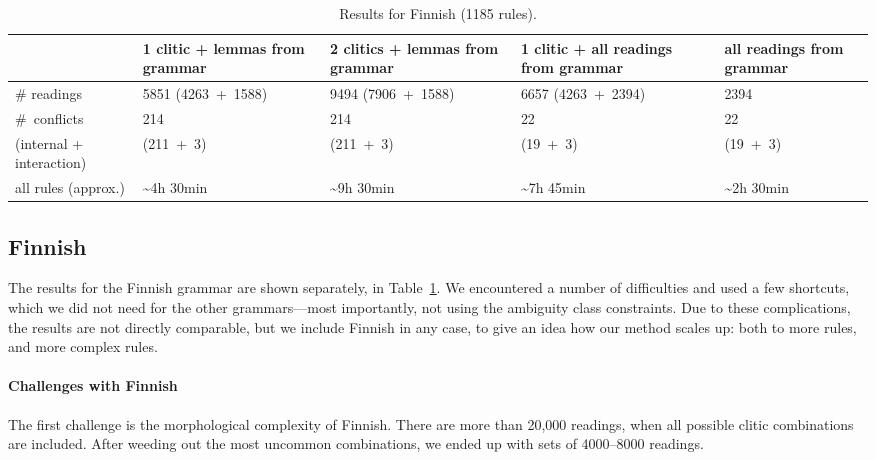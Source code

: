\begin{table}[h]
\centering
\begin{tabular}{|p{3.05cm}|p{2.55cm}|p{2.55cm}|p{2.7cm}|p{2.1cm}|}

\hline
              & 1 clitic + 
                lemmas from 
                 grammar & 2 clitics 
                           + lemmas from 
                              grammar & 1 clitic +
                                          all readings 
                                          from grammar    & all readings from grammar \\ \hline
\# readings   & 5851 (4263~+~1588)
                       & 9494
                       (7906~+~1588) & 6657 (4263~+~2394) & 2394  \\ \hline
\#~conflicts  & 214    & 214         & 22                 & 22 \\
\small{(internal + 
 interaction)} & (211~+~3) & (211~+~3) & (19~+~3)        &  (19~+~3)  \\ \hline

\clock{} all 
       rules (approx.) & \~{}4h 30min     & \~{}9h 30min    & \~{}7h 45min &  \~{}2h 30min \\ \hline


\end{tabular}
\caption{Results for Finnish (1185 rules).}
\label{table:resFin}
\end{table}

\subsection{Finnish} 

The results for the Finnish grammar are shown separately, in Table~\ref{table:resFin}. We encountered a number of difficulties and used a few shortcuts, which we did not need for the other grammars---most importantly, not using the ambiguity class constraints. Due to these complications, the results are not directly comparable, but we include Finnish in any case, 
to give an idea how our method scales up: both to more rules, and more complex rules.

\paragraph{Challenges with Finnish} The first challenge is the morphological complexity of Finnish.
There are more than 20,000 readings, when all possible clitic combinations are included.
After weeding out the most uncommon combinations, we ended up with sets of 4000--8000 readings.

